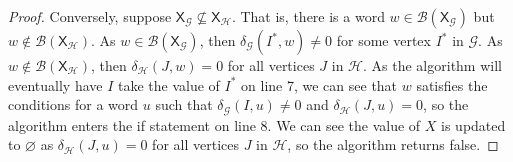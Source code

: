 \documentclass[hidelinks]{article}
\newcommand{\Lc}{\mathcal{L}}  %
\newcommand{\Gc}{\mathcal{G}}  %
\newcommand{\Hc}{\mathcal{H}}  %
\newcommand{\Vc}{\mathcal{V}}
\newcommand{\Bc}{\mathcal{B}}
\newcommand{\GtH}{{\Gc^\to\Hc}}
\newcommand{\shift}[1]{\mathsf{X}_{#1}}
\theoremstyle{definition}
\begin{document}
\begin{proof}
    Conversely, suppose \(\shift{\Gc} \nsubseteq \shift{\Hc}\). That is, there is a word \(w \in \Bc(\shift{\Gc})\)
    but \(w \notin \Bc(\shift{\Hc})\). As \(w \in \Bc(\shift{\Gc})\), then \(\delta_\Gc(I^*, w) \neq 0\)
    for some vertex \(I^*\) in \(\Gc\). As \(w \notin \Bc(\shift{\Hc})\), then 
    \(\delta_\Hc(J, w) = 0\) for all vertices \(J\) in \(\Hc\). As the algorithm will eventually have 
    \(I\) take the value of \(I^*\) on line 7, we can see that \(w\) satisfies the conditions 
    for a word \(u\) such that \(\delta_\Gc(I, u) \neq 0\) and \(\delta_\Hc(J, u) = 0\), so 
    the algorithm enters the if statement on line 8. We can 
    see the value of \(X\) is updated to \(\varnothing\) as \(\delta_\Hc(J, u) = 0\) for all vertices
    \(J\) in \(\Hc\), so the algorithm returns false.

    


\end{proof}


\end{document}
